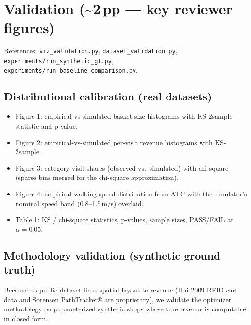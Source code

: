 \documentclass[11pt]{article}
\begin{document}
\section{Validation (\textasciitilde 2\,pp --- key reviewer figures)}
\label{sec:val}

References: \texttt{viz\_validation.py},
\texttt{dataset\_validation.py}, \texttt{experiments/run\_synthetic\_gt.py},
\texttt{experiments/run\_baseline\_comparison.py}.

\subsection*{Distributional calibration (real datasets)}
\begin{itemize}[leftmargin=*]
  \item Figure 1: empirical-vs-simulated basket-size histograms with
    KS-2sample statistic and p-value.
  \item Figure 2: empirical-vs-simulated per-visit revenue
    histograms with KS-2sample.
  \item Figure 3: category visit shares (observed vs.\ simulated)
    with chi-square (sparse bins merged for the chi-square
    approximation).
  \item Figure 4: empirical walking-speed distribution from ATC with
    the simulator's nominal speed band (0.8--1.5\,m/s) overlaid.
  \item Table 1: KS / chi-square statistics, p-values, sample sizes,
    PASS/FAIL at $\alpha=0.05$.
\end{itemize}

\subsection*{Methodology validation (synthetic ground truth)}

Because no public dataset links spatial layout to revenue (Hui 2009
RFID-cart data and Sorensen PathTracker$\circledR$ are proprietary), we
validate the optimizer methodology on parameterized synthetic shops
whose true revenue is computable in closed form.
\end{document}
